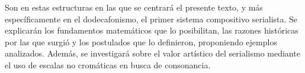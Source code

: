 		Son en estas estructuras en las que se centrará el presente texto, y más específicamente en el dodecafonismo, el primer sistema compositivo serialista. Se explicarán los fundamentos matemáticos que lo posibilitan, las razones históricas por las que surgió y los postulados que lo definieron, proponiendo ejemplos analizados. Además, se investigará sobre el valor artístico del serialismo mediante el uso de escalas no cromáticas en busca de consonancia.
        
    
    \renewcommand*\contentsname{\begin{LARGE}\textbf{Índice general}\end{LARGE}\vspace{-\bigskipamount}}
	\begin{changemargin}{-0.5cm}{-0.5cm}
		\tableofcontents
	\end{changemargin}
	\newpage
	$\ $
	\thispagestyle{empty}
	\newpage
	$\ $
	\thispagestyle{empty}
	\newpage